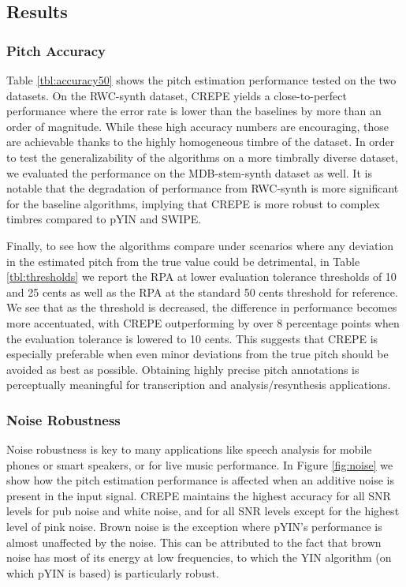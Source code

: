 \subsection{Results}

\subsubsection{Pitch Accuracy}

Table \ref{tbl:accuracy50} shows the pitch estimation performance tested on the two datasets.
On the RWC-synth dataset, CREPE yields a close-to-perfect performance where the error rate is lower than the baselines by more than an order of magnitude.
While these high accuracy numbers are encouraging, those are achievable thanks to the highly homogeneous timbre of the dataset.
In order to test the generalizability of the algorithms on a more timbrally diverse dataset, we evaluated the performance on the MDB-stem-synth dataset as well.
It is notable that the degradation of performance from RWC-synth is more significant for the baseline algorithms, implying that CREPE is more robust to complex timbres compared to pYIN and SWIPE.

Finally, to see how the algorithms compare under scenarios where any deviation in the estimated pitch from the true value could be detrimental, in Table \ref{tbl:thresholds} we report the RPA at lower evaluation tolerance thresholds of 10 and 25 cents as well as the RPA at the standard 50 cents threshold for reference.
We see that as the threshold is decreased, the difference in performance becomes more accentuated, with CREPE 
outperforming by over 8 percentage points when the evaluation tolerance is lowered to 10 cents.
This suggests that CREPE is especially preferable when even minor deviations from the true pitch should be avoided as best as possible.
Obtaining highly precise pitch annotations is perceptually meaningful for transcription and analysis/resynthesis applications.


\subsubsection{Noise Robustness}

Noise robustness is key to many applications like speech analysis for mobile phones or smart speakers, or for live music performance.
In Figure \ref{fig:noise} we show how the pitch estimation performance is affected when an additive noise is present in the input signal.
CREPE maintains the highest accuracy for all SNR levels for pub noise and white noise, and for all SNR levels except for the highest level of pink noise.
Brown noise is the exception where pYIN's performance is almost unaffected by the noise.
This can be attributed to the fact that brown noise has most of its energy at low frequencies, to which the YIN algorithm (on which pYIN is based) is particularly robust.

